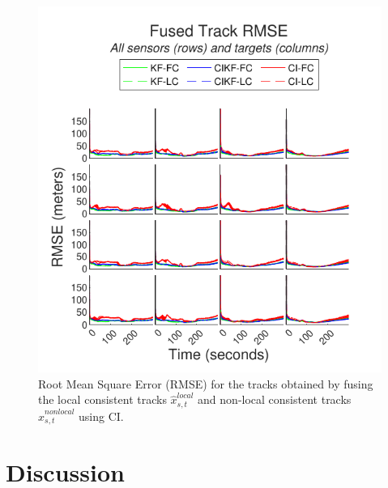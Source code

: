 \documentclass[journal]{IEEEtran}
\begin{document}
\begin{figure}[ht]
    \centering
    \includegraphics[scale=0.85]{fusedtrack_rmse.pdf}
    \caption{Root Mean Square Error (RMSE) for the tracks obtained by fusing the local consistent tracks $\hat{x}_{s,t}^{local}$ and non-local consistent tracks $\hat{x}_{s,t}^{nonlocal}$ using CI.}
    \label{fig:resultsfusedtrackrmse}
\end{figure}

\section{Discussion} \label{discussion}
\end{document}

